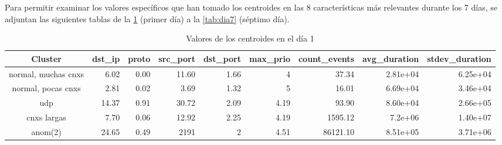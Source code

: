 Para permitir examinar los valores específicos que han tomado los centroides en las 8 características más relevantes durante los 7 días, se adjuntan las siguientes tablas de la \ref{tab:dia1} (primer día) a la \ref{tab:dia7} (séptimo día).

\begin{table}[h]
    \begingroup
    \setlength{\tabcolsep}{2pt} %
    \hspace*{-3cm}
    \begin{tabular}{|c|r|r|r|r|r|r|r|r|}
    \hline
    \textbf{Cluster}    & \textbf{dst\_ip} & \textbf{proto} & \textbf{src\_port} & \textbf{dst\_port} & \textbf{max\_prio} & \textbf{count\_events} & \textbf{avg\_duration} & \textbf{stdev\_duration} \\ \hline
    normal, muchas cnxs & 6.02             & 0.00           & 11.60              & 1.66               & 4                  & 37.34                  & 2.81e+04               & 6.25e+04                 \\ \hline
    normal, pocas cnxs  & 2.81             & 0.02           & 3.69               & 1.32               & 5                  & 16.01                  & 6.69e+04               & 3.46e+04                 \\ \hline
    udp                 & 14.37            & 0.91           & 30.72              & 2.09               & 4.19               & 93.90                  & 8.60e+04               & 2.66e+05                 \\ \hline
    cnxs largas         & 7.70             & 0.06           & 12.92              & 2.25               & 4.19               & 1595.12                & 7.2e+06                & 1.40e+07                 \\ \hline
    anom(2)             & 24.65            & 0.49           & 2191               & 2                  & 4.51               & 86121.10               & 8.51e+05               & 3.71e+06                 \\ \hline
    \end{tabular}
    \endgroup
\caption{Valores de los centroides en el día 1}
\label{tab:dia1}
\end{table}

